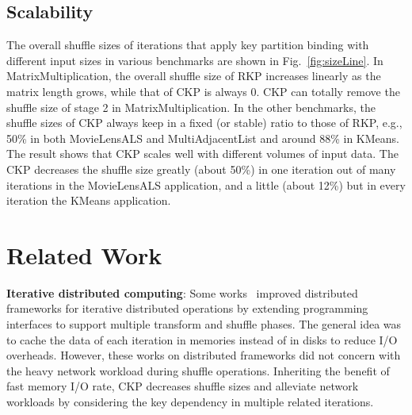 \documentclass[10pt,journal,compsoc]{IEEEtran}
\begin{document}
\subsection{Scalability}
The overall shuffle sizes of iterations that apply key partition 
binding with different input sizes in various benchmarks are shown in Fig.~\ref{fig:sizeLine}. 
In MatrixMultiplication, 
the overall shuffle size of RKP increases linearly as the matrix length grows, while that of CKP is always 0. 
CKP can totally remove the shuffle size of stage 2 in MatrixMultiplication. 
In the other benchmarks, the shuffle sizes of CKP always keep in a fixed (or stable) ratio to those of RKP, e.g., 50\% in both MovieLensALS and MultiAdjacentList and around 88\% in KMeans. 
The result shows that CKP scales well with different volumes of input data. 
The CKP decreases the shuffle size greatly (about 50\%) in one iteration out of many iterations in the MovieLensALS application, and a little (about 12\%) but in every iteration the KMeans application. 



\section{Related Work}\label{section:relatedWork}
\textbf{Iterative distributed computing}: 
Some works~\cite{gunarathne2013scalable, zaharia2012resilient,bu2010haloop, ekanayake2010twister} improved distributed frameworks for iterative distributed operations by extending programming interfaces to support multiple transform and shuffle phases. 
The general idea was to cache the data of each iteration in memories instead of in disks to reduce I/O overheads.
However, these works on distributed frameworks did not concern with the heavy network workload during shuffle operations. 
Inheriting the benefit of fast memory I/O rate, CKP decreases shuffle sizes and alleviate network workloads by considering the key dependency in multiple related iterations. 
\end{document}
